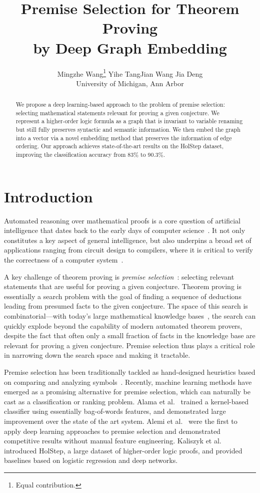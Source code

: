 \documentclass{article}
\title{Premise Selection for Theorem Proving \\by Deep Graph Embedding}
\author{Mingzhe Wang\thanks{Equal contribution.} \quad Yihe Tang\footnotemark[1] \quad  Jian Wang \quad  Jia Deng \\ University of Michigan, Ann Arbor}
\begin{document}
       \maketitle

\begin{abstract}
We propose a deep learning-based approach to the problem of premise selection: selecting mathematical statements relevant for proving a given conjecture. We represent a higher-order logic formula
as a graph that is invariant to variable renaming but still fully preserves syntactic and
semantic information. We then embed the graph into a vector via a novel
embedding method that preserves the information of edge ordering. Our approach achieves state-of-the-art results on the HolStep dataset, improving the classification accuracy from 83\% to 90.3\%.
\end{abstract}

\section{Introduction}

Automated reasoning over mathematical proofs is a core question of artificial intelligence
that dates back to the early days of computer science~\cite{robinson2001handbook}. It not only constitutes a key aspect
of general intelligence, but also underpins a broad set of applications ranging from circuit
design to compilers,  where it is critical to verify the correctness of a computer
system~\cite{kern1999formal,klein2009sel4,leroy2009formal}. 

A key challenge of theorem proving is \emph{premise selection}~\cite{deepmath}: selecting 
 relevant statements that are useful for proving a given conjecture. Theorem proving is
 essentially a search problem with the goal of finding a sequence of deductions leading from
 presumed facts to the given conjecture. The space of this search is combinatorial---with
 today's large mathematical knowledge bases~\cite{Naumowicz2009, Harrison2009}, the search can 
 quickly explode beyond the capability of modern automated theorem provers, despite the
 fact that often only a small fraction of facts in the knowledge base are relevant for
 proving a given conjecture. 
Premise selection thus plays a critical role in narrowing down the search space and making it tractable. 

Premise selection has been traditionally tackled as hand-designed 
heuristics based on comparing and analyzing symbols~\cite{hoder2011sine}. Recently, machine
learning methods have emerged as a promising alternative for premise selection, which can naturally be cast as
a classification or ranking problem. Alama et al.~\cite{alama2014premise} trained 
a kernel-based classifier using essentially bag-of-words features, and demonstrated
large improvement over the state of the art system. Alemi et al.~\cite{deepmath} were the first to apply
deep learning approaches to premise selection and demonstrated competitive results without
manual feature engineering. Kaliszyk et al.~\cite{holstep} introduced HolStep, a large dataset of
higher-order logic proofs, and provided baselines based on logistic regression and deep
networks. 
\end{document}
